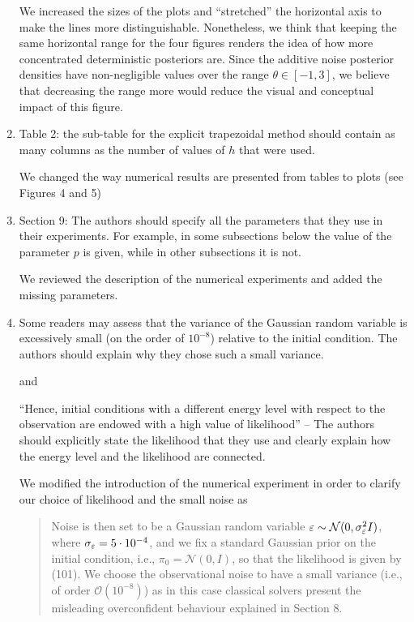 \documentclass[10pt]{article}
\begin{document}
\begin{enumerate}
\begin{itquote}
	\end{itquote}
	We increased the sizes of the plots and ``stretched'' the horizontal axis to make the lines more distinguishable. Nonetheless, we think that keeping the same horizontal range for the four figures renders the idea of how more concentrated deterministic posteriors are. Since the additive noise posterior densities have non-negligible values over the range $\theta \in [-1, 3]$, we believe that decreasing the range more would reduce the visual and conceptual impact of this figure.
	\item \label{it:Ref1Plots}
	\begin{itquote}
		Table 2: the sub-table for the explicit trapezoidal method should contain as many columns as the number of values of $h$ that were used.
	\end{itquote}
	We changed the way numerical results are presented from tables to plots (see Figures 4 and 5)
	\item 
	\begin{itquote}
		Section 9: The authors should specify all the parameters that they use in their experiments. For example, in some subsections below the value of the parameter $p$ is given, while in other subsections it is not. 
	\end{itquote}
	We reviewed the description of the numerical experiments and added the missing parameters.
	\item
	\begin{itquote}
		{\normalfont [Section 9.7]} Some readers may assess that the variance of the Gaussian random variable is excessively small (on the order of $10^{-8}$) relative to the initial condition. The authors should explain why they chose such a small variance.
	\end{itquote}
	and
	\begin{itquote}
		``Hence, initial conditions with a different energy level with respect to the observation are endowed with a high value of likelihood'' -- The authors should explicitly state the likelihood that they use and clearly explain how the energy level and the likelihood are connected.
	\end{itquote}
	We modified the introduction of the numerical experiment in order to clarify our choice of likelihood and the small noise as
	\begin{quote}
		Noise is then set to be a Gaussian random variable $\varepsilon \sim \mathcal{N}(0, \sigma_\varepsilon^2 I)$, where $\sigma_\varepsilon = 5 \cdot 10^{-4}$, and we fix a standard Gaussian prior on the initial condition, i.e., $\pi_0 = \mathcal N(0, I)$, so that the likelihood is given by (101). We choose the observational noise to have a small variance (i.e., of order $\mathcal O(10^{-8})$) as in this case classical solvers present the misleading overconfident behaviour explained in Section 8.

\end{quote}
\end{enumerate}
\end{document}

